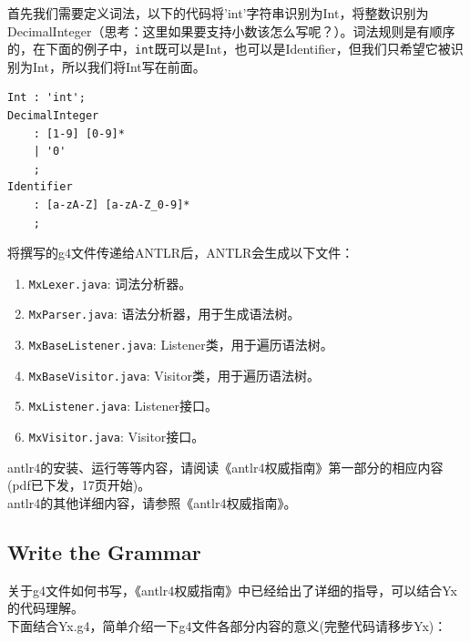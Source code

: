 首先我们需要定义词法，以下的代码将'int'字符串识别为Int，将整数识别为DecimalInteger（思考：这里如果要支持小数该怎么写呢？）。词法规则是有顺序的，在下面的例子中，\texttt{int}既可以是Int，也可以是Identifier，但我们只希望它被识别为Int，所以我们将Int写在前面。
\begin{lstlisting}
Int : 'int';
DecimalInteger
    : [1-9] [0-9]*
    | '0'
    ;
Identifier
    : [a-zA-Z] [a-zA-Z_0-9]*
    ;
\end{lstlisting}



将撰写的g4文件传递给ANTLR后，ANTLR会生成以下文件：
\begin{enumerate}
    \item \texttt{MxLexer.java}: 词法分析器。
    \item \texttt{MxParser.java}: 语法分析器，用于生成语法树。
    \item \texttt{MxBaseListener.java}: Listener类，用于遍历语法树。
    \item \texttt{MxBaseVisitor.java}: Visitor类，用于遍历语法树。
    \item \texttt{MxListener.java}: Listener接口。
    \item \texttt{MxVisitor.java}: Visitor接口。
\end{enumerate}


antlr4的安装、运行等等内容，请阅读《antlr4权威指南》第一部分的相应内容(pdf已下发，17页开始)。\\

antlr4的其他详细内容，请参照《antlr4权威指南》。

\subsection{Write the Grammar}
关于g4文件如何书写，《antlr4权威指南》中已经给出了详细的指导，可以结合Yx的代码理解。\\

下面结合Yx.g4，简单介绍一下g4文件各部分内容的意义(完整代码请移步Yx)：\\

